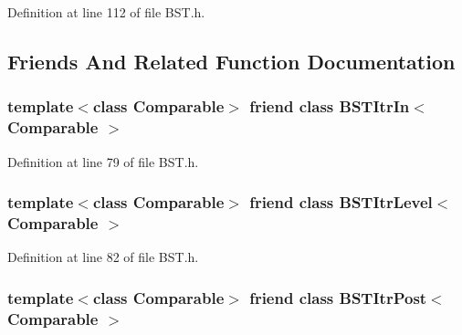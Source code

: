 Definition at line 112 of file B\-S\-T.\-h.



\subsection{Friends And Related Function Documentation}
\hypertarget{class_b_s_t_aab3993acac2ab24a0b59edb0c3acc775}{
\subsubsection[{B\-S\-T\-Itr\-In$<$ Comparable $>$}]{\setlength{\rightskip}{0pt plus 5cm}template$<$class Comparable$>$ friend class {\bf B\-S\-T\-Itr\-In}$<$ Comparable $>$\hspace{0.3cm}{\ttfamily [friend]}}}\label{class_b_s_t_aab3993acac2ab24a0b59edb0c3acc775}


Definition at line 79 of file B\-S\-T.\-h.

\hypertarget{class_b_s_t_a26ff00bc0d87069aed877f10fd3c80a8}{
\subsubsection[{B\-S\-T\-Itr\-Level$<$ Comparable $>$}]{\setlength{\rightskip}{0pt plus 5cm}template$<$class Comparable$>$ friend class {\bf B\-S\-T\-Itr\-Level}$<$ Comparable $>$\hspace{0.3cm}{\ttfamily [friend]}}}\label{class_b_s_t_a26ff00bc0d87069aed877f10fd3c80a8}


Definition at line 82 of file B\-S\-T.\-h.

\hypertarget{class_b_s_t_a5dc153694be266f6e772659486219da7}{
\subsubsection[{B\-S\-T\-Itr\-Post$<$ Comparable $>$}]{\setlength{\rightskip}{0pt plus 5cm}template$<$class Comparable$>$ friend class {\bf B\-S\-T\-Itr\-Post}$<$ Comparable $>$\hspace{0.3cm}{\ttfamily [friend]}}}\label{class_b_s_t_a5dc153694be266f6e772659486219da7}


